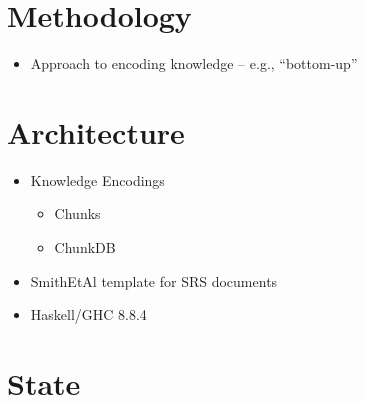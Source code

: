 \section{Methodology}

\begin{itemize}
    \item Approach to encoding knowledge -- e.g., ``bottom-up''
\end{itemize}

\section{Architecture}

\begin{itemize}
    \item Knowledge Encodings
          \begin{itemize}
              \item Chunks
              \item ChunkDB
          \end{itemize}
    \item SmithEtAl template for SRS documents
    \item Haskell/GHC 8.8.4
\end{itemize}

\section{State}

